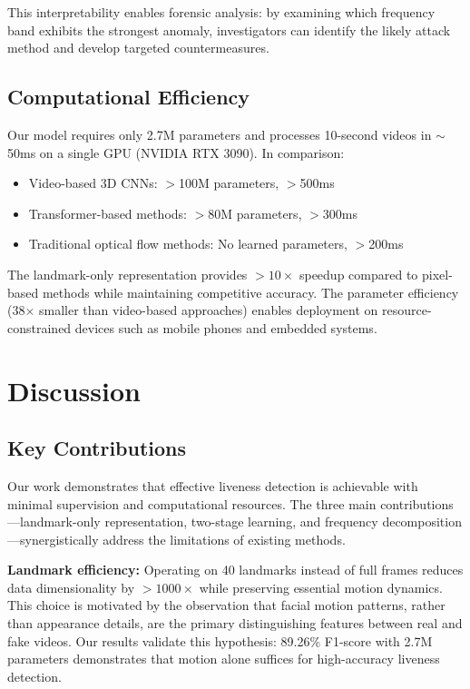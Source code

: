 \documentclass[11pt,twocolumn]{article}
\begin{document}
This interpretability enables forensic analysis: by examining which frequency band exhibits the strongest anomaly, investigators can identify the likely attack method and develop targeted countermeasures.

\subsection{Computational Efficiency}

Our model requires only 2.7M parameters and processes 10-second videos in $\sim$50ms on a single GPU (NVIDIA RTX 3090). In comparison:
\begin{itemize}
    \item Video-based 3D CNNs: $>$100M parameters, $>$500ms
    \item Transformer-based methods: $>$80M parameters, $>$300ms
    \item Traditional optical flow methods: No learned parameters, $>$200ms
\end{itemize}

The landmark-only representation provides $>10\times$ speedup compared to pixel-based methods while maintaining competitive accuracy. The parameter efficiency (38$\times$ smaller than video-based approaches) enables deployment on resource-constrained devices such as mobile phones and embedded systems.

\section{Discussion}
\label{sec:discussion}

\subsection{Key Contributions}

Our work demonstrates that effective liveness detection is achievable with minimal supervision and computational resources. The three main contributions—landmark-only representation, two-stage learning, and frequency decomposition—synergistically address the limitations of existing methods.

\textbf{Landmark efficiency:} Operating on 40 landmarks instead of full frames reduces data dimensionality by $>1000\times$ while preserving essential motion dynamics. This choice is motivated by the observation that facial motion patterns, rather than appearance details, are the primary distinguishing features between real and fake videos. Our results validate this hypothesis: 89.26\% F1-score with 2.7M parameters demonstrates that motion alone suffices for high-accuracy liveness detection.
\end{document}
